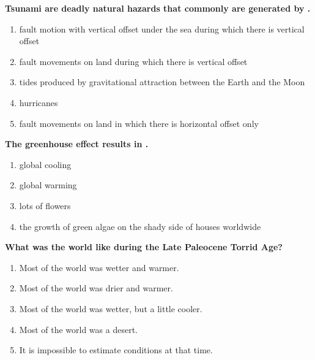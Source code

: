 \item {
\setlength{\itemsep}{0cm}
\setlength{\parskip}{.2cm}
\begin{samepage}
\textbf{
Tsunami are deadly natural hazards that commonly are generated by \makebox[1cm]{\Rivpt\hrulefill\Rivpt}.
}
\begin{enumerate}
\item { 	fault motion with vertical offset under the sea during which there is vertical offset }
\item { 	fault movements on land during which there is vertical offset }
\item { 	tides produced by gravitational attraction between the Earth and the Moon }
\item { 	hurricanes }
\item { 	fault movements on land in which there is horizontal offset only 		 }
\end{enumerate}
\end{samepage}
}
\item {
\setlength{\itemsep}{0cm}
\setlength{\parskip}{.2cm}
\begin{samepage}
\textbf{
The greenhouse effect results in \makebox[1cm]{\Rivpt\hrulefill\Rivpt}.
}
\begin{enumerate}
\item {  global cooling }
\item {  global warming }
\item {  lots of flowers }
\item {  the growth of green algae on the shady side of houses worldwide }
\end{enumerate}
\end{samepage}
}
\item {
\setlength{\itemsep}{0cm}
\setlength{\parskip}{.2cm}
\begin{samepage}
\textbf{
What was the world like during the Late Paleocene Torrid Age? 
}
\begin{enumerate}
\item {  Most of the world was wetter and warmer. }
\item {  Most of the world was drier and warmer. }
\item {  Most of the world was wetter, but a little cooler. }
\item {  Most of the world was a desert. }
\item {  It is impossible to estimate conditions at that time. }
\end{enumerate}
\end{samepage}
}

